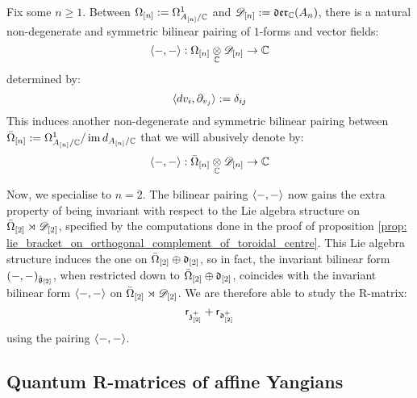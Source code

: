         \begin{remark} \label{remark: pairing_cyclic_1_forms_and_vector_fields} 
            Fix some $n \geq 1$. Between $\Omega_{[n]} := \Omega^1_{A_{[n]}/\mathbb{C}}$ and $\mathscr{D}_{[n]} := \mathfrak{der}_{\mathbb{C}}(A_{n})$, there is a natural non-degenerate and symmetric bilinear pairing of $1$-forms and vector fields:
                $$\<-, -\>: \Omega_{[n]} \tensor_{\bbC} \scrD_{[n]} \to \bbC$$
            determined by:
                $$\langle dv_i, \partial_{v_j} \rangle := \delta_{ij}$$
            This induces another non-degenerate and symmetric bilinear pairing between $\bar{\Omega}_{[n]} := \Omega^1_{A_{[n]}/\mathbb{C}}/\operatorname{im} d_{A_{[n]}/\mathbb{C}}$ that we will abusively denote by:
                $$\<-, -\>: \bar{\Omega}_{[n]} \tensor_{\bbC} \scrD_{[n]} \to \bbC$$

            Now, we specialise to $n = 2$. The bilinear pairing $\langle-, -\rangle$ now gains the extra property of being invariant with respect to the Lie algebra structure on $\bar{\Omega}_{[2]} \rtimes \mathscr{D}_{[2]}$, specified by the computations done in the proof of proposition \ref{prop: lie_bracket_on_orthogonal_complement_of_toroidal_centre}. This Lie algebra structure induces the one on $\bar{\Omega}_{[2]} \oplus \mathfrak{d}_{[2]}$, so in fact, the invariant bilinear form $(-, -)_{\hat{\mathfrak{g}}_{[2]}}$, when restricted down to $\bar{\Omega}_{[2]} \oplus \mathfrak{d}_{[2]}$, coincides with the invariant bilinear form $\langle-, -\rangle$ on $\bar{\Omega}_{[2]} \rtimes \mathscr{D}_{[2]}$. We are therefore able to study the R-matrix:
                $$\mathsf{r}_{\mathfrak{z}_{[2]}^+} + \mathsf{r}_{\mathfrak{d}_{[2]}^+}$$
            using the pairing $\langle-, -\rangle$. 
        \end{remark}

    \subsection{Quantum R-matrices of affine Yangians}